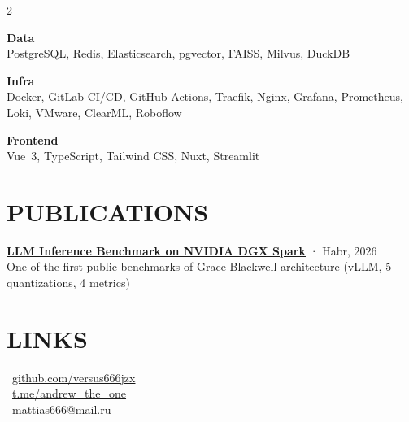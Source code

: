 \documentclass[]{deedy-resume-reversed}
\begin{document}
\begin{paracol}{2}
{\textbf{Data}\\
PostgreSQL, Redis, Elasticsearch, pgvector, FAISS, Milvus, DuckDB
\vspace{4pt}

\textbf{Infra}\\
Docker, GitLab CI/CD, GitHub Actions, Traefik, Nginx, Grafana, Prometheus, Loki, VMware, ClearML, Roboflow
\vspace{4pt}

\textbf{Frontend}\\
Vue~3, TypeScript, Tailwind CSS, Nuxt, Streamlit
}
\sectionsep


\section{PUBLICATIONS}

{\fontsize{9pt}{11pt}\selectfont
\href{https://habr.com/ru/articles/994058/}{\textbf{LLM Inference Benchmark on NVIDIA DGX Spark}} · Habr, 2026\\[2pt]
One of the first public benchmarks of Grace Blackwell architecture (vLLM, 5 quantizations, 4 metrics)
}
\sectionsep


\section{LINKS}

{\fontsize{9pt}{11pt}\selectfont
\faGithub\ \href{https://github.com/versus666jzx}{github.com/versus666jzx}\\[3pt]
\faTelegram\ \href{https://t.me/andrew_the_one}{t.me/andrew\_the\_one}\\[3pt]
\faEnvelope\ \href{mailto:mattias666@mail.ru}{mattias666@mail.ru}
}

\end{paracol}
\end{document}
